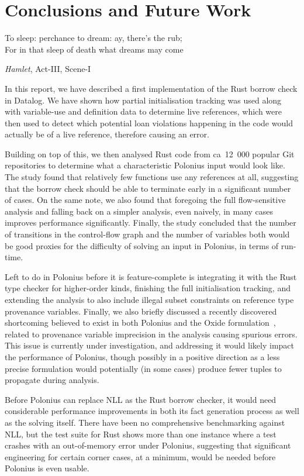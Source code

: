 \documentclass[11pt,a4paper,twoside,openany,draft]{report}
\begin{document}
\chapter{Conclusions and Future Work}\label{cha:conclusions}
\epigraph{To sleep: perchance to dream: ay, there's the rub;\\
  For in that sleep of death what dreams may come}%
{\textit{Hamlet}, Act-III, Scene-I}

In this report, we have described a first implementation of the Rust borrow
check in Datalog. We have shown how partial initialisation tracking was used
along with variable-use and definition data to determine live references, which
were then used to detect which potential loan violations happening in the code
would actually be of a live reference, therefore causing an error.

Building on top of this, we then analysed Rust code from  ca~12~000 popular Git
repositories to determine what a characteristic Polonius input would look like.
The study found that relatively few functions use any references at all,
suggesting that the borrow check should be able to terminate early in a
significant number of cases. On the same note, we also found that foregoing the
full flow-sensitive analysis and falling back on a simpler analysis, even
naively, in many cases improves performance significantly. Finally, the study
concluded that the number of transitions in the control-flow graph and the
number of variables both would be good proxies for the difficulty of solving an
input in Polonius, in terms of run-time.

Left to do in Polonius before it is feature-complete is integrating it with the
Rust type checker for higher-order kinds, finishing the full initialisation
tracking, and extending the analysis to also include illegal subset constraints
on reference type provenance variables. Finally, we also briefly discussed a
recently discovered shortcoming believed to exist in both Polonius and the Oxide
formulation~\cite{weiss_oxide:_2019}, related to provenance variable imprecision
in the analysis causing spurious errors. This issue is currently under
investigation, and addressing it would likely impact the performance of
Polonius, though possibly in a positive direction as a less precise formulation
would potentially (in some cases) produce fewer tuples to propagate during
analysis.

Before Polonius can replace NLL as the Rust borrow checker, it would need
considerable performance improvements in both its fact generation process as
well as the solving itself. There have been no comprehensive benchmarking
against NLL, but the test suite for Rust shows more than one instance where a
test crashes with an out-of-memory error under Polonius, suggesting that
significant engineering for certain corner cases, at a minimum, would be needed
before Polonius is even usable.
\end{document}
